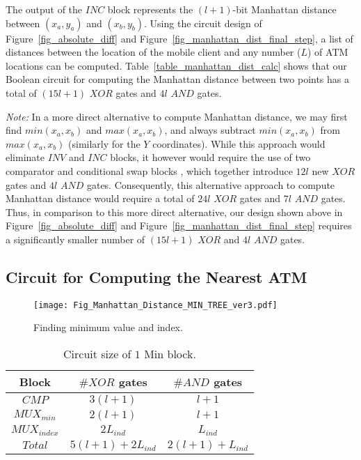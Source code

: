 \documentclass[10pt,journal,cspaper,compsoc]{IEEEtran}
\begin{document}
The output of the $INC$ block represents the $(l+1)$-bit Manhattan distance between $(x_a,y_a)$ and $(x_b,y_b)$. Using the circuit design of Figure~\ref{fig_absolute_diff} and Figure~\ref{fig_manhattan_dist_final_step}, a list of distances between the location of the mobile client and any number ($L$) of ATM locations can be computed. Table~\ref{table_manhattan_dist_calc} shows that our Boolean circuit for computing the Manhattan distance between two points has a total of $(15l+1)$ $XOR$ gates and $4l$ $AND$ gates.


{\em Note:} In a more direct alternative to compute Manhattan distance, we may first find $min(x_a,x_b)$ and $max(x_a,x_b)$, and always subtract $min(x_a,x_b)$ from $max(x_a,x_b)$ (similarly for the $Y$ coordinates). While this approach would eliminate $INV$ and $INC$ blocks, it however would require the use of two comparator and conditional swap blocks \cite{huang2012private}, which together introduce $12l$ new $XOR$ gates and $4l$ $AND$ gates. Consequently, this alternative approach to compute Manhattan distance would require a total of $24l$ $XOR$ gates and $7l$ $AND$ gates. Thus, in comparison to this more direct alternative, our design shown above in Figure~\ref{fig_absolute_diff} and Figure~\ref{fig_manhattan_dist_final_step} requires a significantly smaller number of $(15l+1)$ $XOR$ and $4l$ $AND$ gates.


\subsection{Circuit for Computing the Nearest ATM}

\begin{figure}[t]
\centering
\texttt{[image: Fig\_Manhattan\_Distance\_MIN\_TREE\_ver3.pdf]}
\caption{Finding minimum value and index.}\label{fig_min_tree}
\end{figure}

\begin{table}[!t]
\renewcommand{\arraystretch}{1.3}
\caption{Circuit size of $1$ Min block.}
\label{table_one_min_value_index_block}
\centering
\begin{tabular}{||c||c||c||}
\hline
\bfseries Block & \bfseries $\#XOR$ gates & \bfseries $\#AND$ gates\\
\hline
$CMP$ & $3(l+1)$ & $l+1$\\
\hline
$MUX_{min}$ & $2(l+1)$ & $l+1$\\
\hline
$MUX_{index}$ & $2L_{ind}$ & $L_{ind}$\\
\hline
$Total$ & $5(l+1)+2L_{ind}$ & $2(l+1)+L_{ind}$\\
\hline
\end{tabular}
\end{table}
\end{document}
